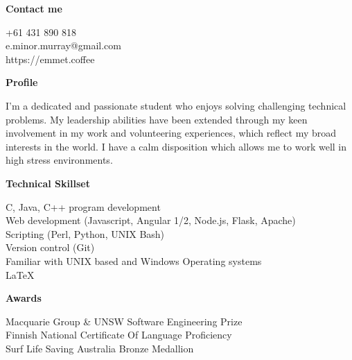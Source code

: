\documentclass{article}
\newcommand{\mytitle}[1]{{\Large\textbf{#1}} \vspace{0.2cm}}
\begin{document}
\begin{minipage}[t]{0.25\linewidth}
    \vspace{0.2cm}
    {
        \mytitle{Contact me}

        +61 431 890 818 \\
        e.minor.murray@gmail.com \\
        https://emmet.coffee \\
    }

    \vspace{1cm}

    {
        \mytitle{Profile}

        I'm a dedicated and passionate student who enjoys solving challenging technical problems.
        My leadership abilities have been extended through my keen involvement in my work and volunteering experiences, which reflect my broad interests in the world.
        I have a calm disposition which allows me to work well in high stress environments. \\
    }

    \vspace{0.3cm}

    {
        \mytitle{Technical Skillset}

        C, Java, C++ program development \\ 

        Web development (Javascript, Angular 1/2, Node.js, Flask, Apache) \\

        Scripting (Perl, Python, UNIX Bash) \\

        Version control (Git) \\

        Familiar with UNIX based and Windows Operating systems \\

        {\large \LaTeX}
    }

    \vspace{0.5cm}

    {
        \mytitle{Awards}

        Macquarie Group \& UNSW Software Engineering Prize \\

        Finnish National Certificate Of Language Proficiency \\

        Surf Life Saving Australia Bronze Medallion
    }


\end{minipage}
\end{document}
